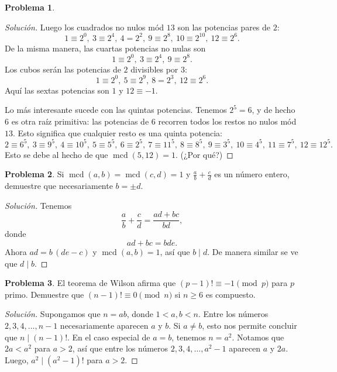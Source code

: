 \documentclass{article}
\DeclareMathOperator{\mcd}{mcd}
\theoremstyle{definition}
\newtheorem{problema}{Problema}
\newenvironment{solucion}{\begin{proof}[Solución]}{\end{proof}}
\begin{document}
\begin{problema}
\begin{solucion}
    Luego los cuadrados no nulos mód $13$ son las potencias pares de $2$:
    \[ 1 \equiv 2^0, ~
      3 \equiv 2^4, ~
      4 = 2^2, ~
      9 \equiv 2^8, ~
      10 \equiv 2^{10}, ~
      12 \equiv 2^6. \]
    De la misma manera, las cuartas potencias no nulas son
    \[ 1 \equiv 2^0, ~
      3 \equiv 2^4, ~
      9 \equiv 2^8. \]
    Los cubos serán las potencias de $2$ divisibles por $3$:
    \[ 1 \equiv 2^0, ~
      5 \equiv 2^9, ~
      8 = 2^3, ~
      12 \equiv 2^6. \]    
    Aquí las sextas potencias son $1$ y $12 \equiv -1$.

    Lo más interesante sucede con las quintas potencias. Tenemos $2^5 = 6$, y de
    hecho $6$ es otra raíz primitiva: las potencias de $6$ recorren todos los
    restos no nulos mód $13$. Esto significa que cualquier resto es una quinta potencia:
    \[
      2 \equiv 6^5, ~
      3 \equiv 9^5, ~
      4 \equiv 10^5, ~
      5 \equiv 5^5, ~
      6 \equiv 2^5, ~
      7 \equiv 11^5, ~
      8 \equiv 8^5, ~
      9 \equiv 3^5, ~
      10 \equiv 4^5, ~
      11 \equiv 7^5, ~
      12 \equiv 12^5.
    \]
    Esto se debe al hecho de que $\mcd (5,12) = 1$. (¿Por qué?)
  \end{solucion}\fi
\end{problema}

\begin{problema}
  Si $\mcd (a,b) = \mcd (c,d) = 1$ y $\frac{a}{b} + \frac{c}{d}$ es un número
  entero, demuestre que necesariamente $b = \pm d$.

  \ifdefined\solutions\begin{solucion}
    Tenemos
    $$\frac{a}{b} + \frac{c}{d} = \frac{ad + bc}{bd},$$
    donde
    $$ad + bc = bde.$$
    Ahora $ad = b\,(de - c)$ y $\mcd (a,b) = 1$, así que $b \mid d$. De manera
    similar se ve que $d \mid b$.
  \end{solucion}\fi
\end{problema}

\begin{problema}
  El teorema de Wilson afirma que $(p - 1)! \equiv -1 \pmod{p}$ para $p$
  primo. Demuestre que $(n-1)! \equiv 0 \pmod{n}$ si $n \ge 6$ es compuesto.

  \ifdefined\solutions\begin{solucion}    
    Supongamos que $n = ab$, donde $1 < a,b < n$. Entre los números
    $2,3,4,\ldots,n-1$ necesariamente aparecen $a$ y $b$. Si $a \ne b$, esto nos
    permite concluir que $n \mid (n-1)!$. En el caso especial de $a = b$,
    tenemos $n = a^2$. Notamos que $2a < a^2$ para $a > 2$, así que entre los
    números $2,3,4,\ldots,a^2-1$ aparecen $a$ y $2a$. Luego, $a^2 \mid (a^2-1)!$
    para $a > 2$.
  \end{solucion}\fi
\end{problema}
\end{document}
